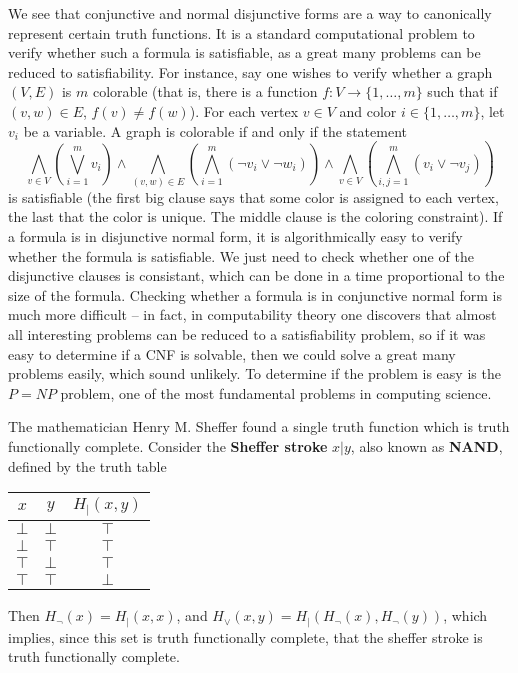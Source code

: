We see that conjunctive and normal disjunctive forms are a way to canonically represent certain truth functions. It is a standard computational problem to verify whether such a formula is satisfiable, as a great many problems can be reduced to satisfiability. For instance, say one wishes to verify whether a graph $(V,E)$ is $m$ colorable (that is, there is a function $f: V \to \{ 1, \dots, m \}$ such that if $(v,w) \in E$, $f(v) \neq f(w)$). For each vertex $v \in V$ and color $i \in \{ 1, \dots, m \}$, let $v_i$ be a variable. A graph is colorable if and only if the statement
%
\[ \bigwedge_{v \in V} \left( \bigvee_{i = 1}^m v_i \right) \wedge \bigwedge_{(v,w) \in E} \left( \bigwedge_{i = 1}^m (\neg v_i \vee \neg w_i) \right) \wedge \bigwedge_{v \in V} \left( \bigwedge_{i,j = 1}^m (v_i \vee \neg v_j) \right) \]
%
is satisfiable (the first big clause says that some color is assigned to each vertex, the last that the color is unique. The middle clause is the coloring constraint). If a formula is in disjunctive normal form, it is algorithmically easy to verify whether the formula is satisfiable. We just need to check whether one of the disjunctive clauses is consistant, which can be done in a time proportional to the size of the formula. Checking whether a formula is in conjunctive normal form is much more difficult -- in fact, in computability theory one discovers that almost all interesting problems can be reduced to a satisfiability problem, so if it was easy to determine if a CNF is solvable, then we could solve a great many problems easily, which sound unlikely. To determine if the problem is easy is the $P = NP$ problem, one of the most fundamental problems in computing science.

\begin{example}
    The mathematician Henry M. Sheffer found a single truth function which is truth functionally complete. Consider the {\bf Sheffer stroke} $x|y$, also known as {\bf NAND}, defined by the truth table
    \begin{center}
    \begin{tabular}{| c | c | c |}
        \hline $x$ & $y$ & $H_|(x,y)$\\
        \hline $\bot$ & $\bot$ & $\top$\\
        $\bot$ & $\top$ & $\top$\\
        $\top$ & $\bot$ & $\top$\\
        $\top$ & $\top$ & $\bot$\\
        \hline
    \end{tabular}
    \end{center}
    Then $H_\neg(x) = H_|(x,x)$, and $H_\vee(x,y) = H_|(H_\neg(x), H_\neg(y))$, which implies, since this set is truth functionally complete, that the sheffer stroke is truth functionally complete.
\end{example}

